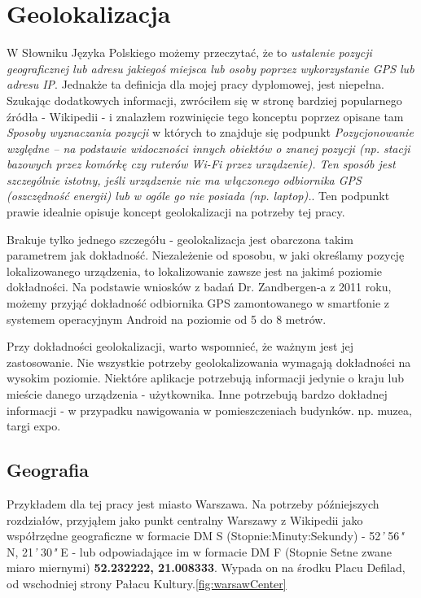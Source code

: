 \section{Geolokalizacja}
W Słowniku Języka Polskiego możemy przeczytać, że to \textit{ustalenie pozycji geograficznej lub adresu jakiegoś miejsca lub osoby poprzez wykorzystanie GPS lub adresu IP}\cite{GeolokalizacjaSJP}. Jednakże ta definicja dla mojej pracy dyplomowej, jest niepełna. Szukając dodatkowych informacji, zwróciłem się w stronę bardziej popularnego źródła - Wikipedii - i znalazłem rozwinięcie tego konceptu poprzez opisane tam \textit{Sposoby wyznaczania pozycji} w których to znajduje się podpunkt \textit{Pozycjonowanie względne – na podstawie widoczności innych obiektów o znanej pozycji (np. stacji bazowych przez komórkę czy ruterów Wi-Fi przez urządzenie). Ten sposób jest szczególnie istotny, jeśli urządzenie nie ma włączonego odbiornika GPS (oszczędność energii) lub w ogóle go nie posiada (np. laptop).}\cite{GeolokalizacjaWiki}. Ten podpunkt prawie idealnie opisuje koncept geolokalizacji na potrzeby tej pracy.

Brakuje tylko jednego szczegółu - geolokalizacja jest obarczona takim parametrem jak dokładność. Niezależenie od sposobu, w jaki określamy pozycję lokalizowanego urządzenia, to lokalizowanie zawsze jest na jakimś poziomie dokładności. Na podstawie wniosków z badań Dr. Zandbergen-a z 2011 roku, możemy przyjąć dokładność odbiornika GPS zamontowanego w smartfonie z systemem operacyjnym Android na poziomie od 5 do 8 metrów.\cite{GpsAccurancyZandbergen}

Przy dokładności geolokalizacji, warto wspomnieć, że ważnym jest jej zastosowanie. Nie wszystkie potrzeby geolokalizowania wymagają dokładności na wysokim poziomie. Niektóre aplikacje potrzebują informacji jedynie o kraju lub mieście danego urządzenia - użytkownika. Inne potrzebują bardzo dokładnej informacji - w przypadku nawigowania w pomieszczeniach budynków. np. muzea, targi expo. %



\subsection{Geografia}
Przykładem dla tej pracy jest miasto Warszawa. Na potrzeby późniejszych rozdziałów, przyjąłem jako punkt centralny Warszawy z Wikipedii\cite{WarszawaWiki} jako współrzędne geograficzne w formacie DM S (Stopnie:Minuty:Sekundy) - 52\textit{'} 56\textit{"} N, 21\textit{'} 30\textit{"} E - lub odpowiadające im w formacie DM F (Stopnie Setne zwane miaro miernymi) \textbf{52.232222, 21.008333}. Wypada on na środku Placu Defilad, od wschodniej strony Pałacu Kultury.\ref{fig:warsawCenter}

